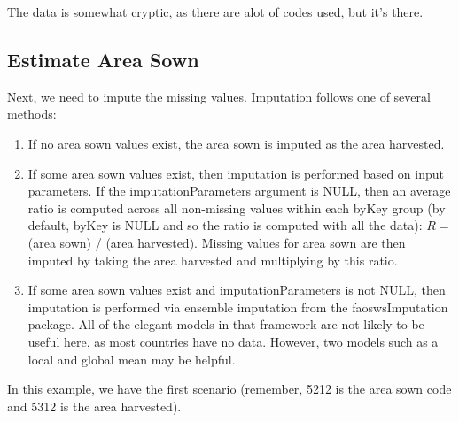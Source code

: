 \documentclass[nojss]{jss}
\begin{document}
The data is somewhat cryptic, as there are alot of codes used, but it's there.

\subsection{Estimate Area Sown}

Next, we need to impute the missing values.  Imputation follows one of several
methods:
\begin{enumerate}
    \item If no area sown values exist, the area sown is imputed as the area
    harvested.
    \item If some area sown values exist, then imputation is performed based on
    input parameters.  If the imputationParameters argument is NULL, then an
    average ratio is computed across all non-missing values within each byKey
    group (by default, byKey is NULL and so the ratio is computed with all the
    data): $R = $(area sown) / (area harvested).  Missing values for area sown
    are then imputed by taking the area harvested and multiplying by this
    ratio.
    \item If some area sown values exist and imputationParameters is not NULL,
    then imputation is performed via ensemble imputation from the
    faoswsImputation package.  All of the elegant models in that framework are
    not likely to be useful here, as most countries have no data.  However,
    two models such as a local and global mean may be helpful.
\end{enumerate}

In this example, we have the first scenario (remember, 5212 is the area sown
code and 5312 is the area harvested).
\end{document}
